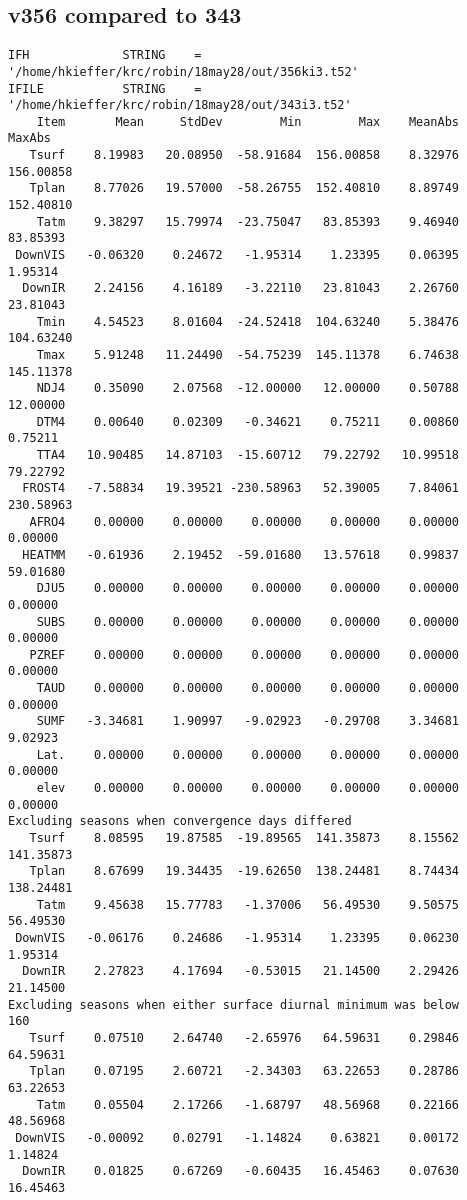 \documentclass{article}
\begin{document}
\subsection{v356 compared to 343}
\vspace{-3.mm} 
\begin{verbatim}
IFH             STRING    = '/home/hkieffer/krc/robin/18may28/out/356ki3.t52'
IFILE           STRING    = '/home/hkieffer/krc/robin/18may28/out/343i3.t52'
    Item       Mean     StdDev        Min        Max    MeanAbs     MaxAbs
   Tsurf    8.19983   20.08950  -58.91684  156.00858    8.32976  156.00858
   Tplan    8.77026   19.57000  -58.26755  152.40810    8.89749  152.40810
    Tatm    9.38297   15.79974  -23.75047   83.85393    9.46940   83.85393
 DownVIS   -0.06320    0.24672   -1.95314    1.23395    0.06395    1.95314
  DownIR    2.24156    4.16189   -3.22110   23.81043    2.26760   23.81043
    Tmin    4.54523    8.01604  -24.52418  104.63240    5.38476  104.63240
    Tmax    5.91248   11.24490  -54.75239  145.11378    6.74638  145.11378
    NDJ4    0.35090    2.07568  -12.00000   12.00000    0.50788   12.00000
    DTM4    0.00640    0.02309   -0.34621    0.75211    0.00860    0.75211
    TTA4   10.90485   14.87103  -15.60712   79.22792   10.99518   79.22792
  FROST4   -7.58834   19.39521 -230.58963   52.39005    7.84061  230.58963
   AFRO4    0.00000    0.00000    0.00000    0.00000    0.00000    0.00000
  HEATMM   -0.61936    2.19452  -59.01680   13.57618    0.99837   59.01680
    DJU5    0.00000    0.00000    0.00000    0.00000    0.00000    0.00000
    SUBS    0.00000    0.00000    0.00000    0.00000    0.00000    0.00000
   PZREF    0.00000    0.00000    0.00000    0.00000    0.00000    0.00000
    TAUD    0.00000    0.00000    0.00000    0.00000    0.00000    0.00000
    SUMF   -3.34681    1.90997   -9.02923   -0.29708    3.34681    9.02923
    Lat.    0.00000    0.00000    0.00000    0.00000    0.00000    0.00000
    elev    0.00000    0.00000    0.00000    0.00000    0.00000    0.00000
Excluding seasons when convergence days differed
   Tsurf    8.08595   19.87585  -19.89565  141.35873    8.15562  141.35873
   Tplan    8.67699   19.34435  -19.62650  138.24481    8.74434  138.24481
    Tatm    9.45638   15.77783   -1.37006   56.49530    9.50575   56.49530
 DownVIS   -0.06176    0.24686   -1.95314    1.23395    0.06230    1.95314
  DownIR    2.27823    4.17694   -0.53015   21.14500    2.29426   21.14500
Excluding seasons when either surface diurnal minimum was below     160
   Tsurf    0.07510    2.64740   -2.65976   64.59631    0.29846   64.59631
   Tplan    0.07195    2.60721   -2.34303   63.22653    0.28786   63.22653
    Tatm    0.05504    2.17266   -1.68797   48.56968    0.22166   48.56968
 DownVIS   -0.00092    0.02791   -1.14824    0.63821    0.00172    1.14824
  DownIR    0.01825    0.67269   -0.60435   16.45463    0.07630   16.45463
\end{verbatim} 
\end{document}
